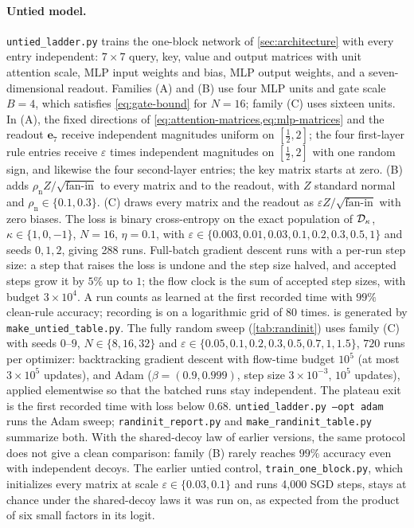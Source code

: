 \paragraph{Untied model.}
\texttt{untied\_ladder.py} trains the one-block network of \cref{sec:architecture} with every entry independent:
$7\times7$ query, key, value and output matrices with unit attention scale, MLP input weights and bias, MLP output weights, and a seven-dimensional readout.
Families (A) and (B) use four MLP units and gate scale $B=4$, which satisfies \cref{eq:gate-bound} for $N=16$; family (C) uses sixteen units.
In (A), the fixed directions of \cref{eq:attention-matrices,eq:mlp-matrices} and the readout $\bm e_7$ receive independent magnitudes uniform on $[\tfrac{1}{2},2]$;
the four first-layer rule entries receive $\varepsilon$ times independent magnitudes on $[\tfrac{1}{2},2]$ with one random sign, and likewise the four second-layer entries;
the key matrix starts at zero. (B) adds $\rho_{\mathrm n}Z/\sqrt{\text{fan-in}}$ to every matrix and to the readout, with $Z$ standard normal and $\rho_{\mathrm n}\in\{0.1,0.3\}$.
(C) draws every matrix and the readout as $\varepsilon Z/\sqrt{\text{fan-in}}$ with zero biases.
The loss is binary cross-entropy on the exact population of $\mathcal D_{\kappa}$, $\kappa\in\{1,0,-1\}$, $N=16$, $\eta=0.1$,
with $\varepsilon\in\{0.003,0.01,0.03,0.1,0.2,0.3,0.5,1\}$ and seeds $0,1,2$, giving 288 runs.
Full-batch gradient descent runs with a per-run step size: a step that raises the loss is undone and the step size halved,
and accepted steps grow it by $5\%$ up to $1$; the flow clock is the sum of accepted step sizes, with budget $3\times10^4$.
A run counts as learned at the first recorded time with $99\%$ clean-rule accuracy; recording is on a logarithmic grid of 80 times.
 is generated by \texttt{make\_untied\_table.py}.
The fully random sweep (\cref{tab:randinit}) uses family (C) with seeds $0$--$9$, $N\in\{8,16,32\}$ and $\varepsilon\in\{0.05,0.1,0.2,0.3,0.5,0.7,1,1.5\}$, $720$ runs per optimizer:
backtracking gradient descent with flow-time budget $10^5$ (at most $3\times10^5$ updates), and Adam ($\beta=(0.9,0.999)$, step size $3\times10^{-3}$, $10^5$ updates),
applied elementwise so that the batched runs stay independent. The plateau exit is the first recorded time with loss below $0.68$.
\texttt{untied\_ladder.py --opt adam} runs the Adam sweep; \texttt{randinit\_report.py} and \texttt{make\_randinit\_table.py} summarize both.
With the shared-decoy law of earlier versions, the same protocol does not give a clean comparison: family (B) rarely reaches $99\%$ accuracy even with independent decoys.
The earlier untied control, \texttt{train\_one\_block.py}, which initializes every matrix at scale $\varepsilon\in\{0.03,0.1\}$ and runs 4{,}000 SGD steps,
stays at chance under the shared-decoy laws it was run on, as expected from the product of six small factors in its logit.

